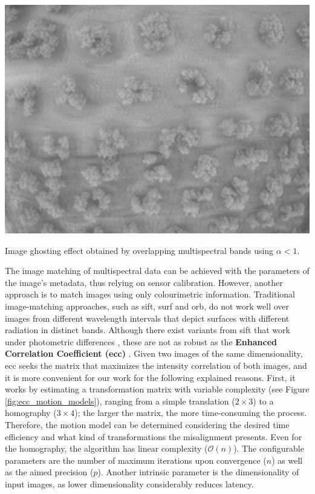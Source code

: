 \begin{marginfigure}[.2cm]
  \includegraphics{figs/image_fusion/multispectral_ghost_effect.png}
  \caption{Image ghosting effect obtained by overlapping multispectral bands using $\alpha < 1$.}
  \label{fig:multispectral_ghost_effect}
\end{marginfigure}
The image matching of multispectral data can be achieved with the parameters of the image's metadata, thus relying on sensor calibration. However, another approach is to match images using only colourimetric information. Traditional image-matching approaches, such as \acrshort{sift}, \acrshort{surf} and \acrshort{orb}, do not work well over images from different wavelength intervals that depict surfaces with different radiation in distinct bands. Although there exist variants from \acrshort{sift} that work under photometric differences \cite{park_pi-sift_2008}, these are not as robust as the \textbf{Enhanced Correlation Coefficient (\acrshort{ecc})} \cite{evangelidis_parametric_2008}. Given two images of the same dimensionality, \acrshort{ecc} seeks the matrix that maximizes the intensity correlation of both images, and it is more convenient for our work for the following explained reasons. First, it works by estimating a transformation matrix with variable complexity (see Figure \ref{fig:ecc_motion_models}), ranging from a simple translation ($2 \times 3$) to a homography ($3 \times 4$); the larger the matrix, the more time-consuming the process. Therefore, the motion model can be determined considering the desired time efficiency and what kind of transformations the misalignment presents. Even for the homography, the algorithm has linear complexity ($\mathcal{O}(n)$). The configurable parameters are the number of maximum iterations upon convergence ($n$) as well as the aimed precision ($p$). Another intrinsic parameter is the dimensionality of input images, as lower dimensionality considerably reduces latency.

